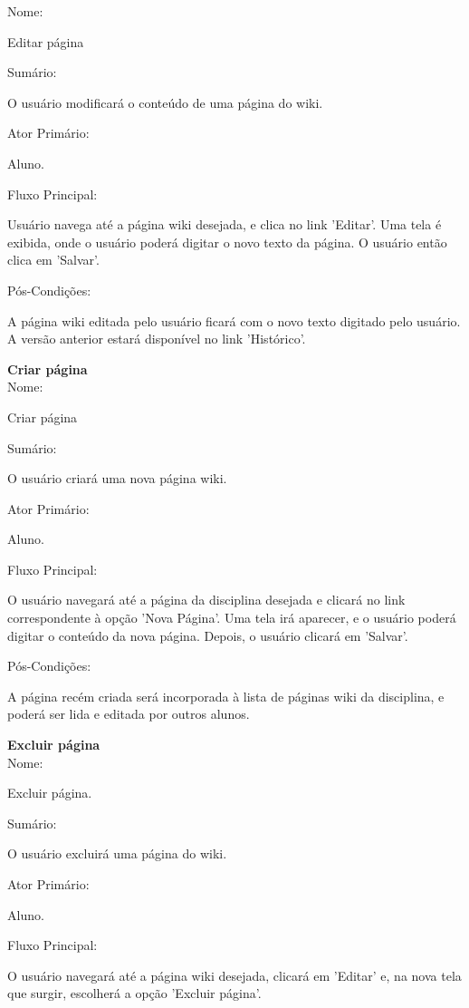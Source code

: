 \documentclass[11pt]{article}
\begin{document}
Nome:

      Editar página

Sumário:

      O usuário modificará o conteúdo de uma página do wiki. 

Ator Primário:

      Aluno. 

Fluxo Principal:

      Usuário navega até a página wiki desejada, e clica no link 'Editar'. Uma tela é exibida, onde o usuário poderá digitar o novo texto da página. O usuário então clica em 'Salvar'. 

Pós-Condições:

      A página wiki editada pelo usuário ficará com o novo texto digitado pelo usuário. A versão anterior estará disponível no link 'Histórico'. 

\textbf{Criar página}
\\

Nome:

      Criar página 

Sumário:

      O usuário criará uma nova página wiki. 

Ator Primário:

      Aluno. 

Fluxo Principal:

      O usuário navegará até a página da disciplina desejada e clicará no link correspondente à opção 'Nova Página'. Uma tela irá aparecer, e o usuário poderá digitar o conteúdo da nova página. Depois, o usuário clicará em 'Salvar'. 

Pós-Condições:

      A página recém criada será incorporada à lista de páginas wiki da disciplina, e poderá ser lida e editada por outros alunos. 

\textbf{Excluir página}
\\

Nome:

      Excluir página. 

Sumário:

      O usuário excluirá uma página do wiki. 

Ator Primário:

      Aluno. 

Fluxo Principal:

      O usuário navegará até a página wiki desejada, clicará em 'Editar' e, na nova tela que surgir, escolherá a opção 'Excluir página'. 
\end{document}
